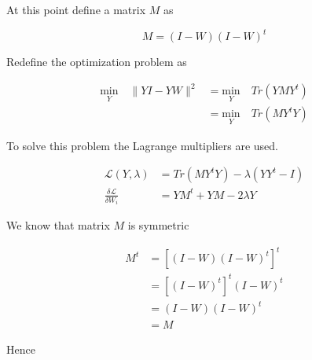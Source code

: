 \documentclass[12pt,journal]{IEEEtran}
\begin{document}
    At this point define a matrix $M$ as

    \begin{equation*}
        M = (I-W) (I-W)^t
    \end{equation*}

    Redefine the optimization problem as

    \begin{equation*}
        \begin{aligned}
            \underset{Y}{\text{min}} \quad \lVert YI - Y W \rVert^2
            &=
            \underset{Y}{\text{min}} \quad Tr(Y M Y^t)\\
            &=
            \underset{Y}{\text{min}} \quad Tr(M Y^t Y)
        \end{aligned}
    \end{equation*}

    To solve this problem the Lagrange multipliers are used.

    \begin{equation*}
        \begin{aligned}
            \mathcal{L}(Y, \lambda) &= Tr( M Y^t Y) - \lambda (Y Y^t - I)\\
            \frac{\delta \mathcal{L}}{\delta W_i} &= Y M^t + Y M - 2 \lambda Y
        \end{aligned}
    \end{equation*}

    We know that matrix $M$ is symmetric

    \begin{equation*}
        \begin{aligned}
            M^t &= [(I-W) (I-W)^t]^t\\
                &= [(I-W)^t]^t (I-W)^t\\
                &= (I-W) (I-W)^t\\
                &= M
        \end{aligned}
    \end{equation*}

    Hence
\end{document}

